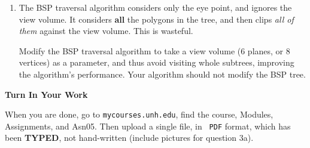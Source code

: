 \documentclass[12pt Times]{article}
\begin{document}
\begin{enumerate}
\item The BSP traversal algorithm considers only the eye point, and
ignores the view volume.  It considers {\bf all} the polygons
in the tree, and then clips {\it all of them} against the view volume.
This is wasteful.

Modify the BSP traversal algorithm to take a view volume (6 planes, or
8 vertices) as a parameter, and thus avoid visiting whole subtrees,
improving the algorithm's performance.  Your algorithm should not
modify the BSP tree.

\end{enumerate}

\begin{centering}
{\bf Turn In Your Work}
\end{centering}

When you are done, go to {\tt mycourses.unh.edu}, find the course,
Modules, Assignments, and Asn05.  Then upload a single file, in {\tt
  PDF} format, which has been {\bf TYPED}, not hand-written (include
pictures for question 3a).
\end{document}
